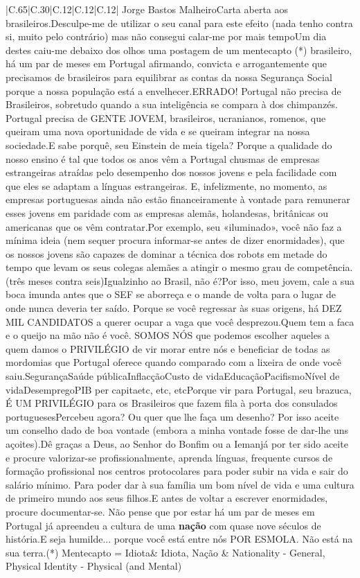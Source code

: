 \documentclass[11pt]{article}
\newlength\mylength
\begin{document}
\begin{center}
\begin{longtable}{|C{.65\mylength}|C{.30\mylength}|C{.12\mylength}|C{.12\mylength}|C{.12\mylength}|}
  \small Jorge Bastos MalheiroCarta aberta aos brasileiros.Desculpe-me de utilizar o seu canal para este efeito (nada tenho contra si, muito pelo contrário) mas não consegui calar-me por mais tempoUm dia destes caiu-me debaixo dos olhos uma postagem de um mentecapto (*) brasileiro, há um par de meses em Portugal afirmando, convicta e arrogantemente que precisamos de brasileiros para equilibrar as contas da nossa Segurança Social porque a nossa população está a envelhecer.ERRADO! Portugal não precisa de Brasileiros, sobretudo quando a sua inteligência se compara à dos chimpanzés. Portugal precisa de GENTE JOVEM, brasileiros, ucranianos, romenos, que queiram uma nova oportunidade de vida e se queiram integrar na nossa sociedade.E sabe porquê, seu Einstein de meia tigela? Porque a qualidade do nosso ensino é tal que todos os anos vêm a Portugal chusmas de empresas estrangeiras atraídas pelo desempenho dos nossos jovens e pela facilidade com que eles se adaptam a línguas estrangeiras. E, infelizmente, no momento, as empresas portuguesas ainda não estão financeiramente à vontade para remunerar esses jovens em paridade com as empresas alemãs, holandesas, britânicas ou americanas que os vêm contratar.Por exemplo, seu «iluminado», você não faz a mínima ideia (nem sequer procura informar-se antes  de dizer enormidades), que os nossos jovens são capazes de dominar a técnica dos robots em metade do tempo que levam os seus colegas alemães a atingir o mesmo grau de competência. (três meses contra seis)Igualzinho ao Brasil, não é?Por isso, meu jovem, cale a sua boca imunda antes que o SEF se aborreça e o mande de volta para o lugar de onde nunca deveria ter saído. Porque se você regressar às suas origens, há DEZ MIL CANDIDATOS a querer ocupar a vaga que você desprezou.Quem tem a faca e o queijo na mão não é você. SOMOS NÓS que podemos escolher aqueles a quem damos o PRIVILÉGIO de vir morar entre nós e beneficiar de todas as mordomias que Portugal oferece quando comparado com a lixeira de onde você saiu.SegurançaSaúde públicaInflacçãoCusto de vidaEducaçãoPacifismoNível de vidaDesempregoPIB per capitaetc, etc, etcPorque vir para Portugal, seu brazuca, É UM PRIVILÉGIO para os Brasileiros que fazem fila à porta dos consulados portuguesesPercebeu agora? Ou quer que lhe faça um desenho? Por isso aceite um conselho dado de boa vontade (embora a minha vontade fosse de dar-lhe uns açoites).Dê graças a Deus, ao Senhor do Bonfim ou a Iemanjá por ter sido aceite e procure valorizar-se profissionalmente, aprenda línguas, frequente cursos de formação profissional nos centros protocolares para poder subir na vida e sair do salário mínimo. Para poder dar à sua família um bom nível de vida e uma cultura de primeiro mundo aos seus filhos.E antes de voltar a escrever enormidades, procure documentar-se. Não pense que por estar há um par de meses em Portugal já apreendeu a cultura de uma \textbf{nação} com quase nove séculos de história.E seja humilde... porque você está entre nós POR ESMOLA. Não está na sua terra.(*) Mentecapto = Idiota\normalsize   & Idiota, Nação & Nationality - General, Physical Identity - Physical (and Mental) 
\end{longtable}
\end{center}
\end{document}

